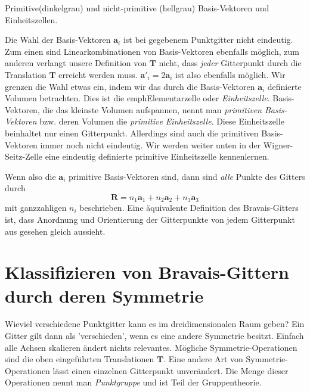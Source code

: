 \begin{marginfigure}

\caption{Primitive(dinkelgrau) und nicht-primitive (hellgrau) Basis-Vektoren und Einheitszellen.}
\end{marginfigure}


Die Wahl der Basis-Vektoren   $\mathbf{a}_i$ ist  bei gegebenem Punktgitter nicht eindeutig. Zum einen sind Linearkombinationen von  Basis-Vektoren ebenfalls möglich, zum anderen verlangt unsere Definition von $\mathbf{T}$ nicht, dass \emph{jeder} Gitterpunkt durch die Translation $\mathbf{T}$  erreicht werden muss.  $\mathbf{a}'_i = 2 \mathbf{a}_i$ ist also ebenfalls möglich. Wir grenzen die Wahl etwas ein, indem wir das durch die Basis-Vektoren   $\mathbf{a}_i$  definierte Volumen betrachten. Dies ist die emph{Elementarzelle} oder \emph{Einheitszelle}. Basis-Vektoren, die das kleinste Volumen aufspannen, nennt man \emph{primitiven Basis-Vektoren} bzw. deren Volumen die \emph{primitive Einheitszelle}. Diese Einheitszelle beinhaltet nur einen Gitterpunkt. Allerdings sind auch die primitiven Basis-Vektoren immer noch nicht eindeutig. Wir werden weiter unten in der Wigner-Seitz-Zelle eine eindeutig definierte primitive Einheitszelle kennenlernen.

Wenn also die $\mathbf{a}_i$ primitive  Basis-Vektoren sind, dann sind \emph{alle} Punkte des Gitters durch 
\begin{equation}
 \mathbf{R} = n_1 \mathbf{a}_1 + n_2 \mathbf{a}_2 + n_3 \mathbf{a}_3  
\end{equation}
mit ganzzahligen  $n_i$ beschrieben. Eine äquivalente Definition des Bravais-Gitters ist, dass Anordnung und Orientierung der Gitterpunkte von jedem Gitterpunkt aus gesehen gleich aussieht.


\section{Klassifizieren von Bravais-Gittern durch deren Symmetrie}

Wieviel verschiedene Punktgitter kann es im dreidimensionalen Raum geben? Ein Gitter gilt dann als 'verschieden', wenn es eine andere Symmetrie besitzt. Einfach alle Achsen skalieren ändert nichts relevantes. Mögliche Symmetrie-Operationen sind die oben eingeführten Translationen $\mathbf{T}$. Eine andere Art von Symmetrie-Operationen lässt einen einzelnen Gitterpunkt unverändert. Die Menge dieser Operationen nennt man \emph{Punktgruppe} und ist Teil der Gruppentheorie.


